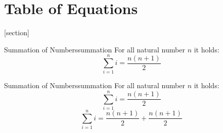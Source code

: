 \documentclass[twocolumn]{article}
\begin{document}
\section{Table of Equations}
[section]
\begin{tcolorbox}[colback=blue!5,colframe=blue!50!black,arc=0mm,
theorem={Equation}{texercise}{Summation}{myMarker}]{Summation of Numbers}{summation}
  For all natural number $n$ it holds:\\[2mm]
  \[\displaystyle\sum\limits_{i=1}^n i = \frac{n(n+1)}{2}\]
\end{tcolorbox}
\begin{tcolorbox}[colback=blue!5,colframe=blue!50!black,arc=0mm,
theorem={Equations}{texercise}{More on summation}{myMarker}]{Summation of Numbers}{summation}
  For all natural number $n$ it holds:\\[2mm]
   \[\displaystyle\sum\limits_{i=1}^n i = \frac{n(n+1)}{2}\]
  \[\displaystyle\sum\limits_{i=1}^n i = \frac{n(n+1)}{2}+ \frac{n(n+1)}{2}\]
\end{tcolorbox}
\end{document}
